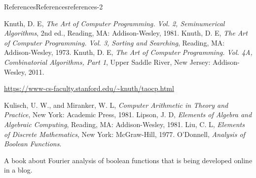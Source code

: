 \documentclass[twoside,10pt,]{book}
\numberwithin{equation}{section}
\begin{document}
\begin{references-chapter-numberless}{References}{}{References}{}{}{references-2}
\begin{referencelist}
\hypertarget{biblio-knuth-1981}{}Knuth, D. E, \textit{The Art of Computer Programming. Vol. 2, Seminumerical Algorithms}, 2nd ed., Reading, MA: Addison-Wesley, 1981.
\hypertarget{biblio-knuth-1973}{}Knuth, D. E, \textit{The Art of Computer Programming. Vol. 3, Sorting and Searching}, Reading, MA: Addison-Wesley, 1973.
\hypertarget{biblio-knuth-2011}{}Knuth, D. E, \textit{The Art of Computer Programming. Vol. 4A, Combinatorial Algorithms, Part 1}, Upper Saddle River, New Jersey: Addison-Wesley, 2011.\par\hypertarget{note-39}{}
\hypertarget{p-6222}{}%
\href{https://www-cs-faculty.stanford.edu/\~knuth/taocp.html}{https:\slash{}\slash{}www-cs-faculty.stanford.edu\slash{}\textasciitilde{}knuth\slash{}taocp.html}%

\hypertarget{biblio-kulisch-1981}{}Kulisch, U. W., and Miranker, W. L, \textit{Computer Arithmetic in Theory and Practice}, New York: Academic Press, 1981.
\hypertarget{biblio-lipson-1981}{}Lipson, J. D, \textit{Elements of Algebra and Algebraic Computing}, Reading, MA: Addison-Wesley, 1981.
\hypertarget{biblio-liu-1977}{}Liu, C. L, \textit{Elements of Discrete Mathematics}, New York: McGraw-Hill, 1977.
\hypertarget{biblio-odonnell-1963}{}O'Donnell, \textit{Analysis of Boolean Functions}. \par\hypertarget{note-40}{}
\hypertarget{p-6223}{}%
A book about Fourier analysis of boolean functions that is being developed online in a blog.%


\end{referencelist}
\end{references-chapter-numberless}
\end{document}
